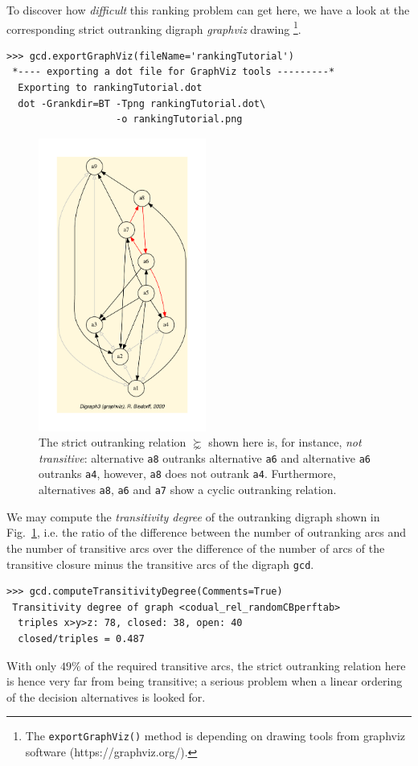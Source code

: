 To discover how \emph{difficult} this ranking problem can get here, we have a look at the corresponding strict outranking digraph \emph{graphviz} drawing \footnote{ The \texttt{exportGraphViz()} method is depending on drawing tools from graphviz software (https://graphviz.org/).}.
\begin{lstlisting}
>>> gcd.exportGraphViz(fileName='rankingTutorial')
 *---- exporting a dot file for GraphViz tools ---------*
  Exporting to rankingTutorial.dot
  dot -Grankdir=BT -Tpng rankingTutorial.dot\
                   -o rankingTutorial.png
\end{lstlisting}
\begin{figure}[h]
\sidecaption[t]
\includegraphics[width=5.5cm]{Figures/rankingTutorial.pdf}
\caption{The strict outranking relation $\succnsim$ shown here is, for instance, \emph{not transitive}: alternative \texttt{a8} outranks alternative \texttt{a6} and alternative \texttt{a6} outranks \texttt{a4}, however, \texttt{a8} does not outrank \texttt{a4}. Furthermore, alternatives \texttt{a8}, \texttt{a6} and \texttt{a7} show a cyclic outranking relation. }
\label{fig:8.1}       %
\end{figure}

We may compute the \emph{transitivity degree} of the outranking digraph shown in Fig.~\ref{fig:8.1}, i.e. the ratio of the difference between the number of outranking arcs and the number of transitive arcs over the difference of the number of arcs of the transitive closure minus the transitive arcs of the digraph \texttt{gcd}.
\begin{lstlisting}
>>> gcd.computeTransitivityDegree(Comments=True)
 Transitivity degree of graph <codual_rel_randomCBperftab>
  triples x>y>z: 78, closed: 38, open: 40
  closed/triples = 0.487
\end{lstlisting}    
With only $49\%$ of the required transitive arcs, the strict outranking relation here is hence very far from being transitive; a serious problem when a linear ordering of the decision alternatives is looked for.


